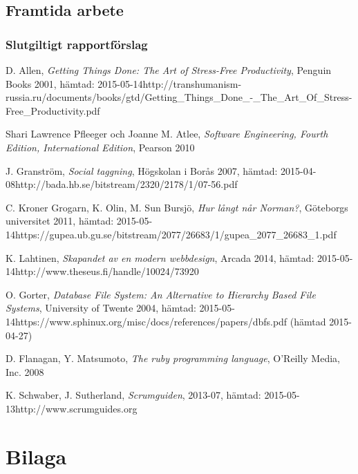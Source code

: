 \documentclass[a4paper,12pt,oneside,final]{extbook}
\begin{document}
\section{Framtida arbete}

\subsection{Slutgiltigt rapportförslag}



\begin{thebibliography}{99}

  D. Allen, \emph{Getting Things Done: The Art of Stress-Free Productivity}, Penguin Books 2001, hämtad: 2015-05-14\newline http://transhumanism-russia.ru/documents/books/gtd/Getting\_Things\_Done\_-\_The\_Art\_Of\_Stress-Free\_Productivity.pdf
  
  Shari Lawrence Pfleeger och Joanne M. Atlee, \emph{Software Engineering, Fourth Edition, International Edition}, Pearson 2010

  J. Granström, \emph{Social taggning}, Högskolan i Borås 2007, hämtad: 2015-04-08\newline http://bada.hb.se/bitstream/2320/2178/1/07-56.pdf

  C. Kroner Grogarn, K. Olin, M. Sun Bursjö, \emph{Hur långt når Norman?}, Göteborgs universitet 2011, hämtad: 2015-05-14\newline https://gupea.ub.gu.se/bitstream/2077/26683/1/gupea\_2077\_26683\_1.pdf

  K. Lahtinen, \emph{Skapandet av en modern webbdesign}, Arcada 2014, hämtad: 2015-05-14\newline http://www.theseus.fi/handle/10024/73920

  O. Gorter, \emph{Database File System: An Alternative to Hierarchy Based File Systems}, University of Twente 2004, hämtad: 2015-05-14\newline https://www.sphinux.org/misc/docs/references/papers/dbfs.pdf (hämtad 2015-04-27)

  D. Flanagan, Y. Matsumoto, \emph{The ruby programming language}, O'Reilly Media, Inc. 2008



 K. Schwaber, J. Sutherland, \emph{Scrumguiden}, 2013-07, hämtad: 2015-05-13\newline http://www.scrumguides.org

\bibitem{}
\bibitem{}
\bibitem{}
\bibitem{}
\bibitem{}
\bibitem{}
\bibitem{}
\bibitem{}
\bibitem{}
\bibitem{}
\bibitem{}

\end{thebibliography}


\appendix

\chapter{Bilaga}
\end{document}
